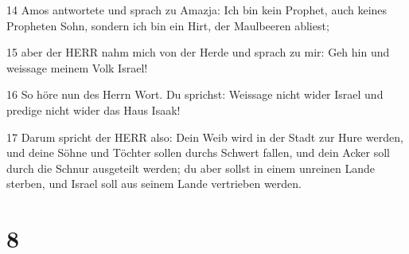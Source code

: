 \par 14 Amos antwortete und sprach zu Amazja: Ich bin kein Prophet, auch keines Propheten Sohn, sondern ich bin ein Hirt, der Maulbeeren abliest;
\par 15 aber der HERR nahm mich von der Herde und sprach zu mir: Geh hin und weissage meinem Volk Israel!
\par 16 So höre nun des Herrn Wort. Du sprichst: Weissage nicht wider Israel und predige nicht wider das Haus Isaak!
\par 17 Darum spricht der HERR also: Dein Weib wird in der Stadt zur Hure werden, und deine Söhne und Töchter sollen durchs Schwert fallen, und dein Acker soll durch die Schnur ausgeteilt werden; du aber sollst in einem unreinen Lande sterben, und Israel soll aus seinem Lande vertrieben werden.

\chapter{8}

